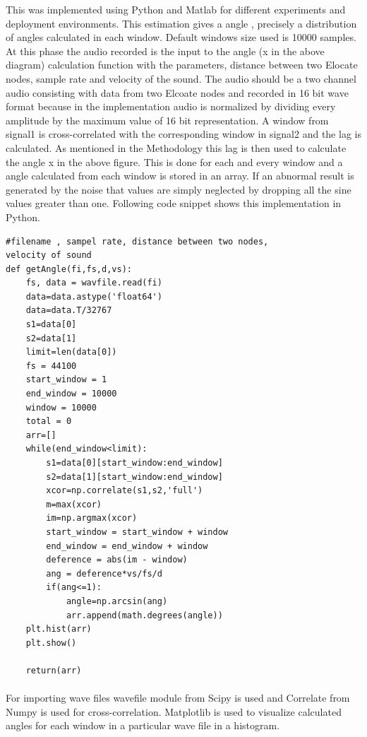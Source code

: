 \documentclass[12pt]{article}
\numberwithin{figure}{section}
\numberwithin{table}{section}
\begin{document}
This was implemented using Python and Matlab for different experiments and deployment environments. This estimation gives a angle , precisely a distribution of angles calculated in each window. Default windows size used is 10000 samples. At this phase the audio recorded is the input to the angle (x in the above diagram) calculation function with the parameters, distance between two Elocate nodes, sample rate and velocity of the sound. The audio should be a two channel audio consisting with data from two Elcoate nodes and recorded in 16 bit wave format because in the implementation audio is normalized by dividing every amplitude by the maximum value of 16 bit representation. A window from signal1 is cross-correlated with the corresponding window in signal2 and the lag is calculated. As mentioned in the Methodology this lag is then used to calculate the angle x in the above figure. This is done for each and every window and a angle calculated from each window is stored in an array. If an abnormal result is generated by the noise that values are simply neglected by dropping all the sine values greater than one. Following code snippet shows this implementation in Python.

\begin{lstlisting}
#filename , sampel rate, distance between two nodes, 
velocity of sound
def getAngle(fi,fs,d,vs):   
    fs, data = wavfile.read(fi)
    data=data.astype('float64')
    data=data.T/32767
    s1=data[0]
    s2=data[1]
    limit=len(data[0])
    fs = 44100
    start_window = 1
    end_window = 10000
    window = 10000
    total = 0
    arr=[]
    while(end_window<limit):
        s1=data[0][start_window:end_window]
        s2=data[1][start_window:end_window]
        xcor=np.correlate(s1,s2,'full')
        m=max(xcor)
        im=np.argmax(xcor)
        start_window = start_window + window
        end_window = end_window + window
        deference = abs(im - window)
        ang = deference*vs/fs/d
        if(ang<=1):
            angle=np.arcsin(ang)
            arr.append(math.degrees(angle))
    plt.hist(arr)
    plt.show()

    return(arr)
\end{lstlisting}

\paragraph{}
For importing wave files wavefile module from Scipy is used and Correlate from Numpy is used for cross-correlation. Matplotlib is used to visualize calculated angles for each window in a particular wave file in a histogram. 
\end{document}
